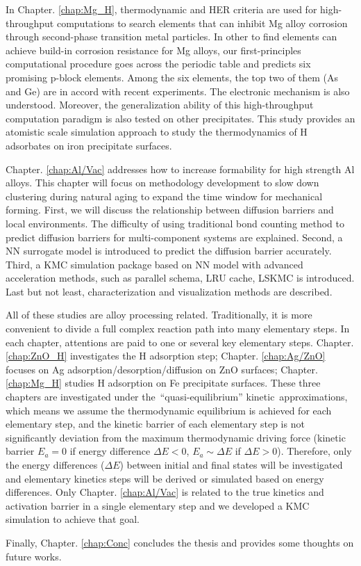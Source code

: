 In Chapter. \ref{chap:Mg_H}, thermodynamic and \acf{HER} criteria are used for high-throughput computations to search elements that can inhibit Mg alloy corrosion through second-phase transition metal particles. In other to find elements can achieve build-in corrosion resistance for Mg alloys, our first-principles computational procedure goes across the periodic table and predicts six promising p-block elements. Among the six elements, the top two of them (As and Ge) are in accord with recent experiments. The electronic mechanism is also understood. Moreover, the generalization ability of this high-throughput computation paradigm is also tested on other precipitates. This study provides an atomistic scale simulation approach to study the thermodynamics of H adsorbates on iron precipitate surfaces.

Chapter. \ref{chap:Al/Vac} addresses how to increase formability for high strength Al alloys. This chapter will focus on methodology development to slow down clustering during natural aging to expand the time window for mechanical forming. First, we will discuss the relationship between diffusion barriers and local environments. The difficulty of using traditional bond counting method to predict diffusion barriers for multi-component systems are explained. Second, a \acf{NN} surrogate model is introduced to predict the diffusion barrier accurately. Third, a \acf{KMC} simulation package based on \ac{NN} model with advanced acceleration methods, such as parallel schema, \acf{LRU} cache, \acf{LSKMC} is introduced. Last but not least, characterization and visualization methods are described.

All of these studies are alloy processing related. Traditionally, it is more convenient to divide a full complex reaction path into many elementary steps. In each chapter, attentions are paid to one or several key elementary steps. Chapter. \ref{chap:ZnO_H} investigates the H adsorption step; Chapter. \ref{chap:Ag/ZnO} focuses on Ag adsorption/desorption/diffusion on ZnO surfaces; Chapter. \ref{chap:Mg_H} studies H adsorption on Fe precipitate surfaces. These three chapters are investigated under the ``quasi-equilibrium'' kinetic approximations, which means we assume the thermodynamic equilibrium is achieved for each elementary step, and the kinetic barrier of each elementary step is not significantly deviation from the maximum thermodynamic driving force (kinetic barrier $E_a = 0$ if energy difference $\Delta E < 0$, $E_a \sim \Delta E$ if $\Delta E > 0$). Therefore, only the energy differences ($\Delta E$) between initial and final states will be investigated and elementary kinetics steps will be derived or simulated based on energy differences. Only Chapter. \ref{chap:Al/Vac} is related to the true kinetics and activation barrier in a single elementary step and we developed a \ac{KMC} simulation to achieve that goal.

Finally, Chapter. \ref{chap:Conc} concludes the thesis and provides some thoughts on future works.